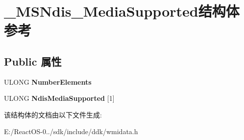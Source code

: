 \hypertarget{struct___m_s_ndis___media_supported}{}\section{\+\_\+\+M\+S\+Ndis\+\_\+\+Media\+Supported结构体 参考}
\label{struct___m_s_ndis___media_supported}
\subsection*{Public 属性}
\begin{DoxyCompactItemize}
\item 
\mbox{\label{struct___m_s_ndis___media_supported_af777d84b052134965443ee4afc60a6fe}} 
U\+L\+O\+NG {\bfseries Number\+Elements}
\item 
\mbox{\label{struct___m_s_ndis___media_supported_aad2fb81229edd3d2af74828ee8cf7f8a}} 
U\+L\+O\+NG {\bfseries Ndis\+Media\+Supported} \mbox{[}1\mbox{]}
\end{DoxyCompactItemize}


该结构体的文档由以下文件生成\+:\begin{DoxyCompactItemize}
\item 
E\+:/\+React\+O\+S-\/0../sdk/include/ddk/wmidata.\+h\end{DoxyCompactItemize}
